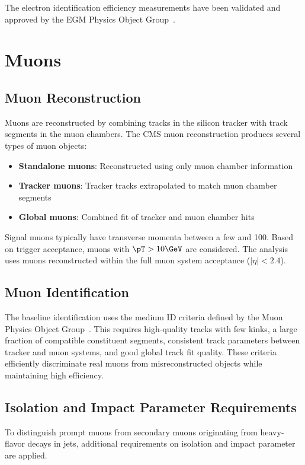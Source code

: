 The electron identification efficiency measurements have been validated and approved by the EGM Physics Object Group~\cite{EGM-IDApproval}.

\section{Muons}
\label{sec:muon_id}

\subsection{Muon Reconstruction}

Muons are reconstructed by combining tracks in the silicon tracker with track segments in the muon chambers. The CMS muon reconstruction produces several types of muon objects:
\begin{itemize}
\item \textbf{Standalone muons}: Reconstructed using only muon chamber information
\item \textbf{Tracker muons}: Tracker tracks extrapolated to match muon chamber segments
\item \textbf{Global muons}: Combined fit of tracker and muon chamber hits
\end{itemize}

Signal muons typically have transverse momenta between a few \GeV and 100\GeV. Based on trigger acceptance, muons with $\pT > 10\GeV$ are considered. The analysis uses muons reconstructed within the full muon system acceptance ($|\eta| < 2.4$).

\subsection{Muon Identification}

The baseline identification uses the medium ID criteria defined by the Muon Physics Object Group~\cite{MuonPOGCBID}. This requires high-quality tracks with few kinks, a large fraction of compatible constituent segments, consistent track parameters between tracker and muon systems, and good global track fit quality. These criteria efficiently discriminate real muons from misreconstructed objects while maintaining high efficiency.

\subsection{Isolation and Impact Parameter Requirements}

To distinguish prompt muons from secondary muons originating from heavy-flavor decays in jets, additional requirements on isolation and impact parameter are applied.

